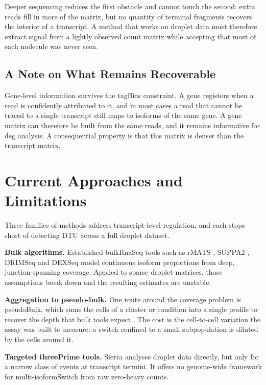 Deeper sequencing reduces the first obstacle and cannot touch the second: extra reads fill in more of the matrix, but no quantity of terminal fragments recovers the interior of a transcript. A method that works on droplet data must therefore extract signal from a lightly observed count matrix while accepting that most of each molecule was never seen.

\subsection*{A Note on What Remains Recoverable}

Gene-level information survives the \gls{tagBias} constraint. A gene registers when a read is confidently attributed to it, and in most cases a read that cannot be traced to a single transcript still maps to isoforms of the same gene. A gene matrix can therefore be built from the same reads, and it remains informative for \gls{deg} analysis. A consequential property is that this matrix is denser than the transcript matrix.

\section{Current Approaches and Limitations}
Three families of methods address transcript-level regulation, and each stops short of detecting DTU across a full droplet dataset.

\textbf{Bulk algorithms.} Established \gls{bulkRnaSeq} tools such as rMATS \cite{shen2014rmats}, SUPPA2 \cite{trincado2018suppa}, DRIMSeq \cite{nowicka2016drimseq} and DEXSeq \cite{anders2012dexseq} model continuous isoform proportions from deep, junction-spanning coverage. Applied to sparse droplet matrices, those assumptions break down and the resulting estimates are unstable.

\textbf{Aggregation to pseudo-bulk.} One route around the coverage problem is \gls{pseudoBulk}, which sums the cells of a cluster or condition into a single profile to recover the depth that bulk tools expect \cite{gilis2021satuRn, tekath2021dturtle}. The cost is the cell-to-cell variation the assay was built to measure: a switch confined to a small subpopulation is diluted by the cells around it.

\textbf{Targeted \gls{threePrime} tools.} Sierra \cite{patrick2020sierra} analyses droplet data directly, but only for a narrow class of events at transcript termini. It offers no genome-wide framework for multi-\gls{isoformSwitch} from raw zero-heavy counts.


